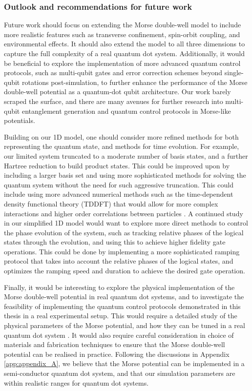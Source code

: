 \documentclass{subfiles}
\begin{document}
\subsubsection*{Outlook and recommendations for future work}
Future work should focus on extending the Morse double-well model to include more realistic features such as transverse confinement, spin-orbit coupling, and environmental effects. It should also extend the model to all three dimensions to capture the full complexity of a real quantum dot system. Additionally, it would be beneficial to explore the implementation of more advanced quantum control protocols, such as multi-qubit gates and error correction schemes beyond single-qubit rotations post-simulation, to further enhance the performance of the Morse double-well potential as a quantum-dot qubit architecture. Our work barely scraped the surface, and there are many avenues for further research into multi-qubit entanglement generation and quantum control protocols in Morse-like potentials. 

Building on our 1D model, one should consider more refined methods for both representing the quantum state, and methods for time evolution. For example, our limited system truncated to a moderate number of basis states, and a further Hartree reduction to build product states. This could be improved upon by including a larger basis set and using more sophisticated methods for solving the quantum system without the need for such aggressive truncation. This could include using more advanced numerical methods such as the time-dependent density functional theory (TDDFT) that would allow for more complex interactions and higher order correlations between particles \cite{car1985unified, hafner2008ab}. A continued study in our simplified 1D model would want to explore more direct methods to control the phase evolution of the system, such as tracking relative phases of the logical states through the evolution, and using this to achieve higher fidelity gate operations. This could be done by implementing a more sophisticated ramping protocol that takes into account the relative phases of the logical states, and optimizes the ramping speed and duration to achieve the desired gate operation.

Finally, it would be interesting to explore the physical implementation of the Morse double-well potential in real quantum dot systems, and to investigate the feasibility of implementing the quantum control protocols demonstrated in this thesis in a real experimental setup. This would require a detailed study of the physical parameters of the Morse potential, and how they can be tuned in a real quantum dot system \cite{garcia2021semiconductor}. It would also require careful consideration in choice of materials and fabrication techniques to ensure that the Morse double-well potential can be realised in practice. Following the discussions in Appendix \ref{app:appendix_A}, we believe that the Morse potential can be implemented in a semi-conductor quantum dot system, and that our simulation parameters are within realistic ranges for quantum dot systems.
\end{document}
